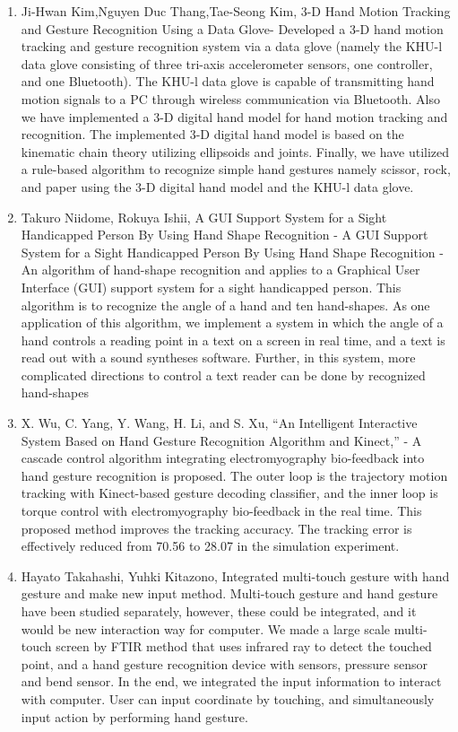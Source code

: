 \documentclass[11pt]{report}
\begin{document}
\begin{enumerate}
    \item Ji-Hwan Kim,Nguyen Duc Thang,Tae-Seong Kim, 3-D Hand Motion Tracking and Gesture Recognition Using a Data Glove- Developed a 3-D hand motion tracking and gesture recognition system via a data glove (namely the KHU-l data glove consisting of three tri-axis accelerometer sensors, one controller, and one Bluetooth). The KHU-l data glove is capable of transmitting hand motion signals to a PC through wireless communication via Bluetooth. Also we have implemented a 3-D digital hand model for hand motion tracking and recognition. The implemented 3-D digital hand model is based on the kinematic chain theory utilizing ellipsoids and joints. Finally, we have utilized a rule-based algorithm to recognize simple hand gestures namely scissor, rock, and paper using the 3-D digital hand model and the KHU-l data glove.
    
    \item Takuro Niidome, Rokuya Ishii, A GUI Support System for a Sight Handicapped Person By Using Hand Shape Recognition - A GUI Support System for a Sight Handicapped Person By Using Hand Shape Recognition - An algorithm of hand-shape recognition and applies to a Graphical User Interface (GUI) support system for a sight handicapped person. This algorithm is to recognize the angle of a hand and ten hand-shapes. As one application of this algorithm, we implement a system in which the angle of a hand controls a reading point in a text on a screen in real time, and a text is read out with a sound syntheses software. Further, in this system, more complicated directions to control a text reader can be done by recognized hand-shapes
    
    \item X. Wu, C. Yang, Y. Wang, H. Li, and S. Xu, “An Intelligent Interactive System Based on Hand Gesture Recognition Algorithm and Kinect,” - A cascade control algorithm integrating electromyography bio-feedback into hand gesture recognition is proposed. The outer loop is the trajectory motion tracking with Kinect-based gesture decoding classifier, and the inner loop is torque control with electromyography bio-feedback in the real time. This proposed method improves the tracking accuracy. The tracking error is effectively reduced from 70.56 to 28.07 in the simulation experiment. 
    
    \item Hayato Takahashi, Yuhki Kitazono, Integrated multi-touch gesture with hand gesture and  make new input method. Multi-touch gesture and hand gesture have been studied separately, however, these could be integrated, and it would be new interaction way for computer. We made a large scale multi-touch screen by FTIR method that uses infrared ray to detect the touched point, and a hand gesture recognition device with sensors, pressure  sensor  and  bend  sensor.  In  the  end,  we  integrated  the input  information  to  interact  with  computer. User can input coordinate by touching, and simultaneously input action by performing hand gesture.
    

\end{enumerate}
\end{document}
